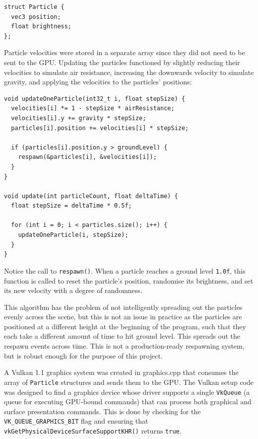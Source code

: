 \documentclass[11pt, a4paper, twocolumn]{article}
\begin{document}
\begin{verbatim}
struct Particle {
  vec3 position;
  float brightness;
};
\end{verbatim}

Particle velocities were stored in a separate array since they did not need to be sent to the GPU. Updating the particles functioned by slightly reducing their velocities to simulate air resistance, increasing the downwards velocity to simulate gravity, and applying the velocities to the particles' positions:

\begin{verbatim}
void updateOneParticle(int32_t i, float stepSize) {
  velocities[i] *= 1 - stepSize * airResistance;
  velocities[i].y += gravity * stepSize;
  particles[i].position += velocities[i] * stepSize;

  if (particles[i].position.y > groundLevel) {
    respawn(&particles[i], &velocities[i]);
  }
}

void update(int particleCount, float deltaTime) {
  float stepSize = deltaTime * 0.5f;

  for (int i = 0; i < particles.size(); i++) {
    updateOneParticle(i, stepSize);
  }
}
\end{verbatim}

Notice the call to \verb|respawn()|. When a particle reaches a ground level \verb|1.0f|, this function is called to reset the particle's position, randomise its brightness, and set its new velocity with a degree of randomness.

This algorithm has the problem of not intelligently spreading out the particles evenly across the scene, but this is not an issue in practice as the particles are positioned at a different height at the beginning of the program, such that they each take a different amount of time to hit ground level. This spreads out the respawn events across time. This is not a production-ready respawning system, but is robust enough for the purpose of this project.

A Vulkan 1.1 graphics system was created in graphics.cpp that consumes the array of \verb|Particle| structures and sends them to the GPU. The Vulkan setup code was designed to find a graphics device whose driver supports a single \verb|VkQueue| (a queue for executing GPU-bound commands) that can process both graphical and surface presentation commands. This is done by checking for the \verb|VK_QUEUE_GRAPHICS_BIT| flag and ensuring that \verb|vkGetPhysicalDeviceSurfaceSupportKHR()| returns \verb|true|.
\end{document}
